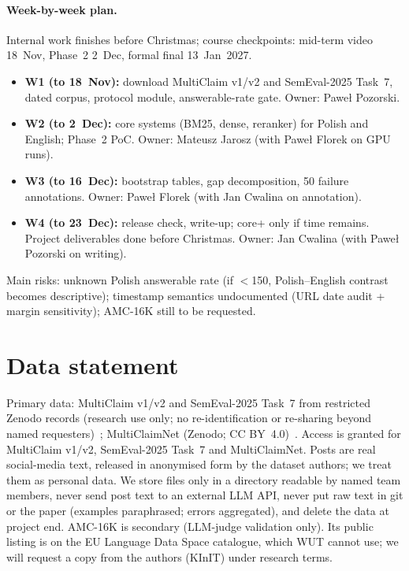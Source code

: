 \documentclass[11pt]{article}
\begin{document}
\paragraph{Week-by-week plan.}
Internal work finishes before Christmas; course checkpoints: mid-term video 18~Nov, Phase~2 2~Dec, formal final 13~Jan~2027.
\begin{itemize}
\setlength\itemsep{0pt}
\item \textbf{W1 (to 18~Nov):} download MultiClaim v1/v2 and SemEval-2025 Task~7, dated corpus, protocol module, answerable-rate gate.
  Owner: Pawe{\l} Pozorski.
\item \textbf{W2 (to 2~Dec):} core systems (BM25, dense, reranker) for Polish and English; Phase~2 PoC.
  Owner: Mateusz Jarosz (with Pawe{\l} Florek on GPU runs).
\item \textbf{W3 (to 16~Dec):} bootstrap tables, gap decomposition, 50 failure annotations.
  Owner: Pawe{\l} Florek (with Jan Cwalina on annotation).
\item \textbf{W4 (to 23~Dec):} release check, write-up; core+ only if time remains. Project deliverables done before Christmas.
  Owner: Jan Cwalina (with Pawe{\l} Pozorski on writing).
\end{itemize}
Main risks: unknown Polish answerable rate (if $<$150, Polish--English contrast becomes descriptive); timestamp semantics undocumented (URL date audit + margin sensitivity); AMC-16K still to be requested.

\section{Data statement}
\label{sec:datastmt}
Primary data: MultiClaim v1/v2 and SemEval-2025 Task~7 from restricted Zenodo records (research use only; no re-identification or re-sharing beyond named requesters)~\cite{moro2025multiclaim,pikuliak2023multilingual,peng2025semeval}; MultiClaimNet (Zenodo; CC BY~4.0)~\cite{panchendrarajan2025multiclaimnet}.
Access is granted for MultiClaim v1/v2, SemEval-2025 Task~7 and MultiClaimNet.
Posts are real social-media text, released in anonymised form by the dataset authors; we treat them as personal data.
We store files only in a directory readable by named team members, never send post text to an external LLM API, never put raw text in git or the paper (examples paraphrased; errors aggregated), and delete the data at project end.
AMC-16K is secondary (LLM-judge validation only). Its public listing is on the EU Language Data Space catalogue, which WUT cannot use; we will request a copy from the authors (KInIT) under research terms.



\end{document}
